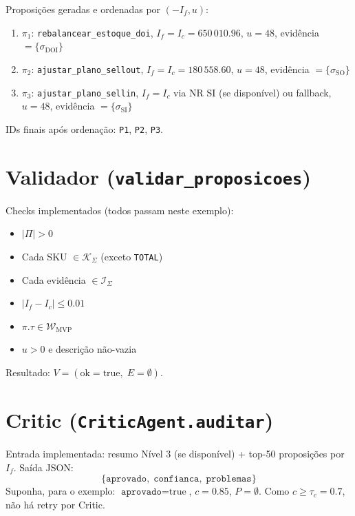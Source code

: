 \documentclass[a4paper, 12pt]{report}
\theoremstyle{definition}
\theoremstyle{remark}
\begin{document}
Proposi\c{c}\~oes geradas e ordenadas por $(-I_f, u)$:

\begin{enumerate}
  \item $\pi_1$: \texttt{rebalancear\_estoque\_doi},
    $I_f = I_c = 650\,010.96$, $u=48$,
    evid\^encia $=\{\sigma_{\text{DOI}}\}$
  \item $\pi_2$: \texttt{ajustar\_plano\_sellout},
    $I_f = I_c = 180\,558.60$, $u=48$,
    evid\^encia $=\{\sigma_{\text{SO}}\}$
  \item $\pi_3$: \texttt{ajustar\_plano\_sellin},
    $I_f = I_c$ via NR SI (se dispon\'ivel) ou fallback,
    $u=48$, evid\^encia $=\{\sigma_{\text{SI}}\}$
\end{enumerate}

IDs finais ap\'os ordena\c{c}\~ao: \texttt{P1}, \texttt{P2}, \texttt{P3}.


\section{Validador (\texttt{validar\_proposicoes})}

Checks implementados (todos passam neste exemplo):

\begin{itemize}
  \item $|\Pi| > 0$
  \item Cada SKU $\in \mathcal{K}_\Sigma$ (exceto \texttt{TOTAL})
  \item Cada evid\^encia $\in \mathcal{I}_\Sigma$
  \item $|I_f - I_c| \leq 0.01$
  \item $\pi.\tau \in \mathcal{W}_{\text{MVP}}$
  \item $u > 0$ e descri\c{c}\~ao n\~ao-vazia
\end{itemize}

Resultado: $V = (\text{ok}=\text{true},\; E=\emptyset)$.


\section{Critic (\texttt{CriticAgent.auditar})}

Entrada implementada: resumo N\'ivel 3 (se dispon\'ivel) + top-50
proposi\c{c}\~oes por $I_f$. Sa\'ida JSON:
\[
  \{\texttt{aprovado},\; \texttt{confianca},\; \texttt{problemas}\}
\]
Suponha, para o exemplo: $\texttt{aprovado}=\text{true}$, $c=0.85$,
$P=\emptyset$. Como $c \geq \tau_c = 0.7$, n\~ao h\'a retry por Critic.
\end{document}
